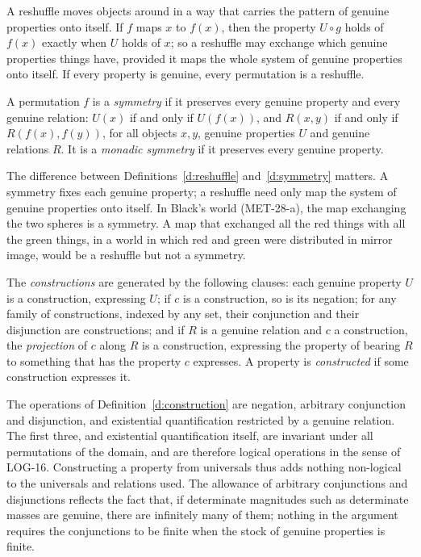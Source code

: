 \documentclass{situationist-preprint}
\begin{document}
A reshuffle moves objects around in a way that carries the pattern of genuine properties onto itself. If $f$ maps $x$ to $f(x)$, then the property $U \circ g$ holds of $f(x)$ exactly when $U$ holds of $x$; so a reshuffle may exchange which genuine properties things have, provided it maps the whole system of genuine properties onto itself. If every property is genuine, every permutation is a reshuffle.

\begin{definition}\label{d:symmetry}
A permutation $f$ is a \emph{symmetry} if it preserves every genuine property and every genuine relation: $U(x)$ if and only if $U(f(x))$, and $R(x,y)$ if and only if $R(f(x),f(y))$, for all objects $x,y$, genuine properties $U$ and genuine relations $R$. It is a \emph{monadic symmetry} if it preserves every genuine property.
\end{definition}

The difference between Definitions~\ref{d:reshuffle} and~\ref{d:symmetry} matters. A symmetry fixes each genuine property; a reshuffle need only map the system of genuine properties onto itself. In Black's world (MET-28-a), the map exchanging the two spheres is a symmetry. A map that exchanged all the red things with all the green things, in a world in which red and green were distributed in mirror image, would be a reshuffle but not a symmetry.

\begin{definition}\label{d:construction}
The \emph{constructions} are generated by the following clauses: each genuine property $U$ is a construction, expressing $U$; if $c$ is a construction, so is its negation; for any family of constructions, indexed by any set, their conjunction and their disjunction are constructions; and if $R$ is a genuine relation and $c$ a construction, the \emph{projection} of $c$ along $R$ is a construction, expressing the property of bearing $R$ to something that has the property $c$ expresses. A property is \emph{constructed} if some construction expresses it.
\end{definition}

The operations of Definition~\ref{d:construction} are negation, arbitrary conjunction and disjunction, and existential quantification restricted by a genuine relation. The first three, and existential quantification itself, are invariant under all permutations of the domain, and are therefore logical operations in the sense of LOG-16. Constructing a property from universals thus adds nothing non-logical to the universals and relations used. The allowance of arbitrary conjunctions and disjunctions reflects the fact that, if determinate magnitudes such as determinate masses are genuine, there are infinitely many of them; nothing in the argument requires the conjunctions to be finite when the stock of genuine properties is finite.
\end{document}
